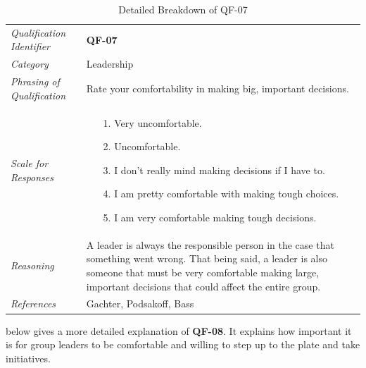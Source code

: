 \documentclass[12pt,letterpaper]{article}
\begin{document}
\begin{table}[H]
	\caption{Detailed Breakdown of QF-07}
	\begin{tabu} to 
		\toprule
		Qualification Identifier & {\bf QF-07}\\
		Category & Leadership \\
		Phrasing of Qualification & Rate your comfortability in making big, important decisions. \\
		Scale for Responses &
		\begin{minipage}[t]{\linewidth}
			\begin{enumerate}
				\item[1.] Very uncomfortable.
				\item[2.] Uncomfortable.
				\item[3.] I don't really mind making decisions if I have to.
				\item[4.] I am pretty comfortable with making tough choices.
				\item[5.] I am very comfortable making tough decisions.
			\end{enumerate}
		\end{minipage}\\
		Reasoning & A leader is always the responsible person in the case that something went wrong. That being said, a leader is also someone that must be very comfortable making large, important decisions that could affect the entire group.\\
		References & Gachter\cite{gachter}, Podsakoff\cite{podsakoff}, Bass\cite{bass} \\
		\toprule
	\end{tabu}
\end{table}

 below gives a more detailed explanation of {\bf QF-08}. It explains how important it is for group leaders to be comfortable and willing to step up to the plate and take initiatives.
\end{document}
